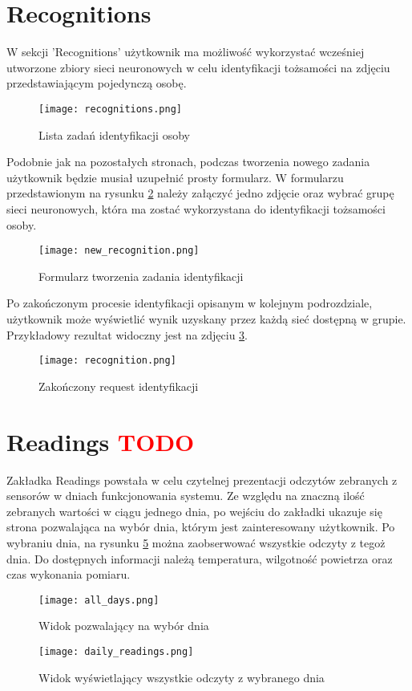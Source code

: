 \section{Recognitions}
W sekcji 'Recognitions' użytkownik ma możliwość wykorzystać wcześniej utworzone zbiory sieci neuronowych w celu identyfikacji tożsamości na zdjęciu przedstawiającym pojedynczą osobę.
\begin{figure}[H]
	\centering
	\texttt{[image: recognitions.png]}
	\caption{Lista zadań identyfikacji osoby}
	\label{fig:recognitions}
\end{figure}
Podobnie jak na pozostałych stronach, podczas tworzenia nowego zadania użytkownik będzie musiał uzupełnić prosty formularz. W formularzu przedstawionym na rysunku \ref{fig:new_recognition} należy załączyć jedno zdjęcie oraz wybrać grupę sieci neuronowych, która ma zostać wykorzystana do identyfikacji tożsamości osoby.
\begin{figure}[H]
	\centering
	\texttt{[image: new\_recognition.png]}
	\caption{Formularz tworzenia zadania identyfikacji}
	\label{fig:new_recognition}
\end{figure}
Po zakończonym procesie identyfikacji opisanym w kolejnym podrozdziale, użytkownik może wyświetlić wynik uzyskany przez każdą sieć dostępną w grupie. Przykładowy rezultat widoczny jest na zdjęciu \ref{fig:recognition}.
\begin{figure}[H]
	\centering
	\texttt{[image: recognition.png]}
	\caption{Zakończony request identyfikacji}
	\label{fig:recognition}
\end{figure}

\section{Readings \textcolor{red}{TODO}}
Zakładka Readings powstała w celu czytelnej prezentacji odczytów zebranych z sensorów w dniach funkcjonowania systemu. Ze względu na znaczną ilość zebranych wartości w ciągu jednego dnia, po wejściu do zakładki ukazuje się strona pozwalająca na wybór dnia, którym jest zainteresowany użytkownik. Po wybraniu dnia, na rysunku \ref{fig:daily_readings} można zaobserwować wszystkie odczyty z tegoż dnia. Do dostępnych informacji należą temperatura, wilgotność powietrza oraz czas wykonania pomiaru.
\begin{figure}[H]
	\centering
	\texttt{[image: all\_days.png]}
	\caption{Widok pozwalający na wybór dnia}
	\label{fig:all_days}
\end{figure}
\begin{figure}[H]
	\centering
	\texttt{[image: daily\_readings.png]}
	\caption{Widok wyświetlający wszystkie odczyty z wybranego dnia}
	\label{fig:daily_readings}
\end{figure}

